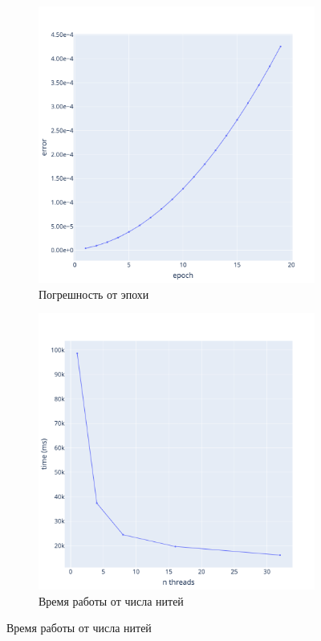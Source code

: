 \documentclass[a4paper,hidelinks,12pt]{article}
\begin{document}
\begin{figure}[H]
\begin{subfigure}{.5\textwidth}
  \centering
  \includegraphics[width=\linewidth]{pictures/Lpi_256_err.png}
  \caption{Погрешность от эпохи}
\end{subfigure}%
\begin{subfigure}{.5\textwidth}
  \centering
  \includegraphics[width=\linewidth]{pictures/Lpi_256_time_threads.png}
  \caption{Время работы от числа нитей}
\end{subfigure}%
\end{figure}
\end{document}

